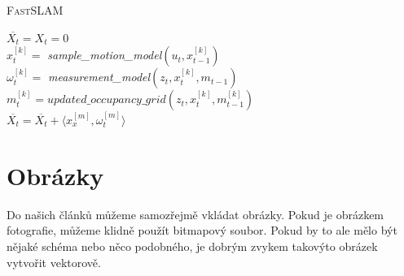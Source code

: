 \documentclass[a4paper,11pt]{article}
\begin{document}
    \begin{algorithm}
        \label{algorithm:FastSLAM}
     \caption{\textsc{FastSLAM}}
     
    \SetNlSkip{-1.0em}
    \SetNlSty{}{}{:}
    \Indp\Indp
    \BlankLine
     $ \overline{X_t} = X_t = 0 $ \\
      {
            $x^{[k]}_{t} = $ \textit{sample\_motion\_model}$(u_t,x^{[k]}_{t-1})$ \\
            $\omega^{[k]}_{t} = $ \textit{measurement\_model}$(z_t,x^{[k]}_{t},m_{t-1})$ \\
            $m^{[k]}_{t} = updated\_occupancy\_grid(z_t,x^{[k]}_{t},m_{t-1}^{[k]})$ \\
            $\overline{X_t} = \overline{X_t} + \langle x_{x}^{[m]}, \omega_{t}^{[m]}\rangle$
            }
    \end{algorithm}
    
    
    \section{Obrázky}
    Do našich článků můžeme samozřejmě vkládat obrázky. Pokud je obrázkem fotografie, můžeme klidně použít bitmapový soubor. Pokud by to ale mělo být nějaké schéma nebo něco podobného, je dobrým zvykem takovýto obrázek vytvořit vektorově.
    
\end{document}
